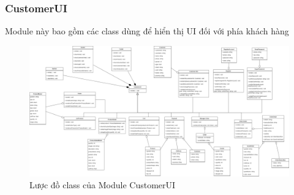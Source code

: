 \subsubsection{CustomerUI}
Module này bao gồm các class dùng để hiển thị UI đối với phía khách hàng
\begin{figure}[!htp]
	\centering
	\includegraphics[width=17cm]{img/Architecture/UI/customer UI.png}
	\newline
	\caption{Lược đồ class của Module CustomerUI}
\end{figure}


